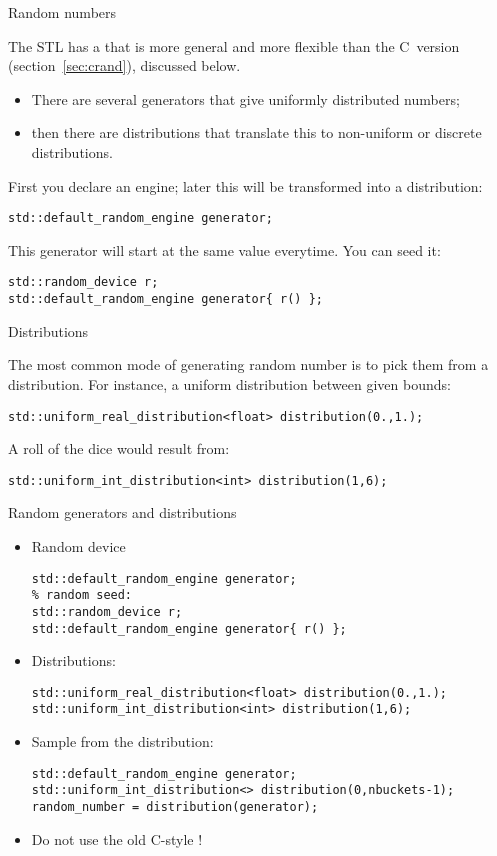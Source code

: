  {Random numbers}
\label{sec:stl:random}

The \ac{STL} has a
that is more general and more flexible than the C~version (section~\ref{sec:crand}),
discussed below.

\begin{itemize}
\item There are several generators that give uniformly distributed
  numbers;
\item then there are distributions that translate this to non-uniform
  or discrete distributions.
\end{itemize}

First you declare an engine; later this will be transformed into a distribution:
\begin{lstlisting}
std::default_random_engine generator;
\end{lstlisting}

This generator will start at the same value everytime.
You can seed it:
\begin{lstlisting}
std::random_device r;
std::default_random_engine generator{ r() };
\end{lstlisting}

 {Distributions}

The most common mode of generating random number
is to pick them from a distribution.
For instance, a uniform distribution between given bounds:
\begin{lstlisting}
std::uniform_real_distribution<float> distribution(0.,1.);
\end{lstlisting}
A roll of the dice would result from:
\begin{lstlisting}
std::uniform_int_distribution<int> distribution(1,6);
\end{lstlisting}

\begin{slide}{Random generators and distributions}
  \label{sl:std-rand-device}
  \begin{itemize}
  \item Random device
\begin{lstlisting}
std::default_random_engine generator;
% random seed:
std::random_device r;
std::default_random_engine generator{ r() };
\end{lstlisting}

\item Distributions:
\begin{lstlisting}
std::uniform_real_distribution<float> distribution(0.,1.);
std::uniform_int_distribution<int> distribution(1,6);
\end{lstlisting}

\item Sample from the distribution:
\begin{lstlisting}
std::default_random_engine generator;
std::uniform_int_distribution<> distribution(0,nbuckets-1);
random_number = distribution(generator);
\end{lstlisting}

  \item Do not use the old C-style !
  \end{itemize}
\end{slide}

